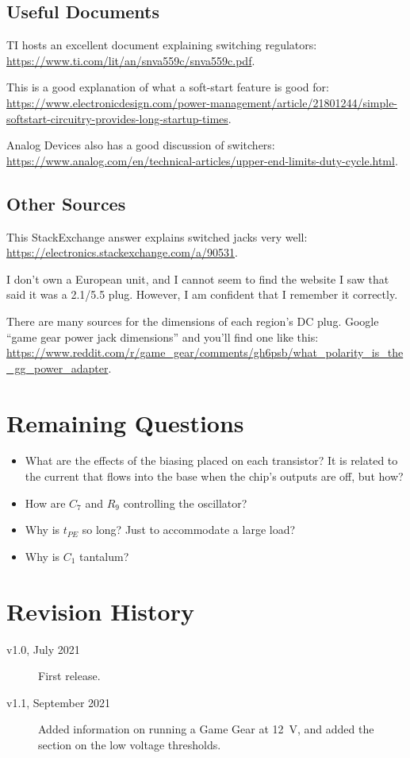 \documentclass{article}
\begin{document}
\subsection{Useful Documents}
TI hosts an excellent document explaining switching regulators:
\url{https://www.ti.com/lit/an/snva559c/snva559c.pdf}.

This is a good explanation of what a soft-start feature is good for:
\url{https://www.electronicdesign.com/power-management/article/21801244/simple-softstart-circuitry-provides-long-startup-times}.

Analog Devices also has a good discussion of switchers:
\url{https://www.analog.com/en/technical-articles/upper-end-limits-duty-cycle.html}.

\subsection{Other Sources}
\label{sec:other_sources}
This Stack\-Ex\-change answer explains switched jacks very well:
\url{https://electronics.stackexchange.com/a/90531}.

I don't own a European unit, and I cannot seem to find the website I
saw that said it was a 2.1/5.5 plug. However, I am confident that I
remember it correctly.

There are many sources for the dimensions of each region's DC
plug. Google ``game gear power jack dimensions'' and you'll find one
like this:
\url{https://www.reddit.com/r/game_gear/comments/gh6psb/what_polarity_is_the_gg_power_adapter}.

\section{Remaining Questions}
\label{sec:remaining_questions}
\begin{itemize}
\item What are the effects of the biasing placed on each transistor?
  It is related to the current that flows into the base when the
  chip's outputs are off, but how?
\item How are $C_7$ and $R_9$ controlling the oscillator?
\item Why is $t_{PE}$ so long? Just to accommodate a large load?
\item Why is $C_1$ tantalum?
\end{itemize}

\section{Revision History}
\begin{description}
\item[v1.0, July 2021] First release.
\item[v1.1, September 2021] Added information on running a Game Gear
  at \qty{12}{\volt}, and added the section on the low voltage thresholds.
\end{description}
\end{document}
